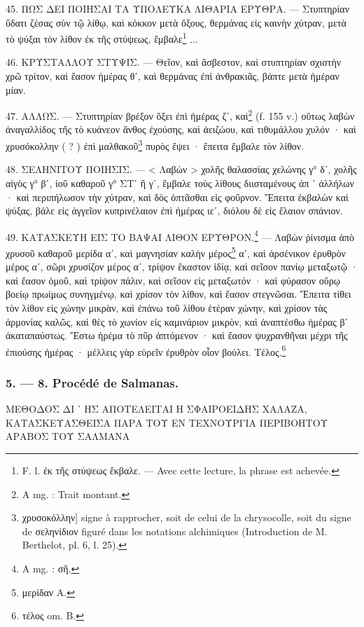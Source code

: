 \documentclass[a4paper, 11pt, oneside, polutonikogreek, french]{article}
\begin{document}
45. ΠΩΣ ΔΕΙ ΠΟΙΗΣΑΙ ΤΑ ΥΠΟΛΕΥΚΑ ΛΙΘΑΡΙΑ ΕΡΥΘΡΑ. --- Στυπτηρίαν ὕδατι ζέσας σὺν τῷ λίθῳ, καὶ κόκκον μετὰ ὄξους, θερμάνας εἰς καινὴν χύτραν, μετὰ τὸ ψύξαι τὸν λίθον ἐκ τῆς στύψεως, ἔμβαλε\footnote{F. l. ἐκ τῆς στύψεως ἔκβαλε. --- Avec cette lecture, la phrase est achevée.} ...

46. ΚΡΥΣΤΑΛΛΟΥ ΣΤΥΨΙΣ. --- Θεῖον, καὶ ἄσβεστον, καὶ στυπτηρίαν σχιστὴν χρῶ τρίτον, καὶ ἔασον ἡμέρας θʹ, καὶ θερμάνας ἐπὶ ἀνθρακιᾶς, βάπτε μετὰ ἡμέραν μίαν.

47. ΑΛΛΩΣ. --- Στυπτηρίαν βρέξον ὄξει ἐπὶ ἡμέρας ζʹ, καὶ\footnote{A mg. : Trait montant.} (f. 155 v.) οὕτως λαβὼν ἀναγαλλίδος τῆς τὸ κυάνεον ἄνθος ἐχούσης, καὶ ἀειζώου, καὶ τιθυμάλλου χυλόν · καὶ χρυσόκολλην ( ? ) ἐπὶ μαλθακοῦ\footnote{χρυσοκόλλην] signe à rapprocher, soit de celui de la chrysocolle, soit du signe de σεληνίδιον figuré dans les notations alchimiques (Introduction de M. Berthelot, pl. 6, l. 25).} πυρὸς ἕψει · ἔπειτα ἔμβαλε τὸν λίθον.

48. ΣΕΛΗΝΙΤΟΥ ΠΟΙΗΣΙΣ. --- < Λαβὼν > χολῆς θαλασσίας χελώνης γ° δʹ, χολῆς αἰγὸς γ° βʹ, ἰοῦ καθαροῦ γ° ΣΤʹ ἢ γʹ, ἔμβαλε τοὺς λίθους διισταμένους ἀπ ᾽ ἀλλήλων · καὶ περιπήλωσον τὴν χύτραν, καὶ δὸς ὀπτᾶσθαι εἰς φοῦρνον. Ἔπειτα ἐκβαλὼν καὶ ψύξας, βάλε εἰς ἀγγεῖον κυπρινέλαιον ἐπὶ ἡμέρας ιεʹ, διόλου δὲ εἰς ἔλαιον σπάνιον.

49. ΚΑΤΑΣΚΕΥΗ ΕΙΣ ΤΟ ΒΑΨΑΙ ΛΙΘΟΝ ΕΡΥΘΡΟΝ.\footnote{A mg. : σῆ.} --- Λαβὼν ῥίνισμα ἀπὸ χρυσοῦ καθαροῦ μερίδα αʹ, καὶ μαγνησίαν καλὴν μέρος\footnote{μερίδαν A.} αʹ, καὶ ἀρσένικον ἐρυθρὸν μέρος αʹ, σῶρι χρυσίζον μέρος αʹ, τρίψον ἕκαστον ἰδίᾳ, καὶ σεῖσον πανίῳ μεταξωτῷ · καὶ ἔασον ὁμοῦ, καὶ τρίψον πάλιν, καὶ σεῖσον εἰς μεταξωτόν · καὶ φύρασον οὔρῳ βοείῳ πρωίμως συνηγμένῳ, καὶ χρίσον τὸν λίθον, καὶ ἔασον στεγνῶσαι. Ἔπειτα τίθει τὸν λίθον εἰς χώνην μικρὰν, καὶ ἐπάνω τοῦ λίθου ἑτέραν χώνην, καὶ χρίσον τὰς ἁρμονίας καλῶς, καὶ θὲς τὸ χωνίον εἰς καμινάριον μικρὸν, καὶ ἀναπτέσθω ἡμέρας βʹ ἀκαταπαύστως. Ἔστω ἠρέμα τὸ πῦρ ἁπτόμενον · καὶ ἔασον ψυχρανθῆναι μέχρι τῆς ἐπιούσης ἡμέρας · μέλλεις γὰρ εὑρεῖν ἐρυθρὸν οἷον βούλει. Τέλος.\footnote{τέλος om. B.}

\bigskip
\centerline{\EightStarTaper}
\centerline{\EightStarTaper\EightStarTaper}
\bigskip

\subsubsection{5. --- 8. Procédé de Salmanas.}

ΜΕΘΟΔΟΣ ΔΙ ᾽ ΗΣ ΑΠΟΤΕΛΕΙΤΑΙ Η ΣΦΑΙΡΟΕΙΔΗΣ ΧΑΛΑΖΑ, ΚΑΤΑΣΚΕΥΑΣΘΕΙΣΑ ΠΑΡΑ ΤΟΥ ΕΝ ΤΕΧΝΟΥΡΓΙΑ ΠΕΡΙΒΟΗΤΟΥ ΑΡΑΒΟΣ ΤΟΥ ΣΑΛΜΑΝΑ
\end{document}
